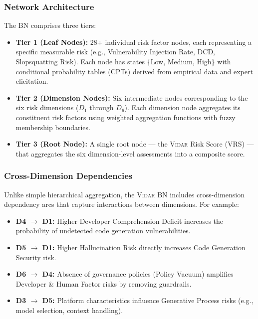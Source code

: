 \documentclass[preprint,review,12pt]{elsarticle}
\newcommand{\vidar}{\textsc{Vidar}}
\begin{document}
\subsubsection{Network Architecture}

The BN comprises three tiers:

\begin{itemize}
    \item \textbf{Tier 1 (Leaf Nodes):} 28+ individual risk factor nodes, each representing a specific measurable risk (e.g., Vulnerability Injection Rate, DCD, Slopsquatting Risk). Each node has states \{Low, Medium, High\} with conditional probability tables (CPTs) derived from empirical data and expert elicitation.

    \item \textbf{Tier 2 (Dimension Nodes):} Six intermediate nodes corresponding to the six risk dimensions ($D_1$ through $D_6$). Each dimension node aggregates its constituent risk factors using weighted aggregation functions with fuzzy membership boundaries.

    \item \textbf{Tier 3 (Root Node):} A single root node --- the \vidar{} Risk Score (VRS) --- that aggregates the six dimension-level assessments into a composite score.
\end{itemize}

\subsubsection{Cross-Dimension Dependencies}

Unlike simple hierarchical aggregation, the \vidar{} BN includes cross-dimension dependency arcs that capture interactions between dimensions. For example:
\begin{itemize}
    \item \textbf{D4 $\rightarrow$ D1:} Higher Developer Comprehension Deficit increases the probability of undetected code generation vulnerabilities.
    \item \textbf{D5 $\rightarrow$ D1:} Higher Hallucination Risk directly increases Code Generation Security risk.
    \item \textbf{D6 $\rightarrow$ D4:} Absence of governance policies (Policy Vacuum) amplifies Developer \& Human Factor risks by removing guardrails.
    \item \textbf{D3 $\rightarrow$ D5:} Platform characteristics influence Generative Process risks (e.g., model selection, context handling).
\end{itemize}
\end{document}
